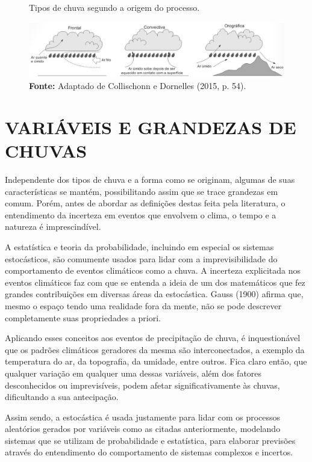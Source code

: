 \begin{figure}[!ht]
	\centering
	\caption{Tipos de chuva segundo a origem do processo.}
	\includegraphics[width=.9\linewidth]{figuras/tipos_de_chuva_segundo_a_origem_do_processo.png}
	\caption*{\textbf{Fonte:} Adaptado de Collischonn e Dornelles (2015, p. 54).}
	\label{fig:tipos_de_chuva_segundo_a_origem_do_processo.png}
\end{figure}

\section{VARIÁVEIS E GRANDEZAS DE CHUVAS}

Independente dos tipos de chuva e a forma como se originam, algumas de suas características se mantém, possibilitando assim que se trace grandezas em comum. Porém, antes de abordar as definições destas feita pela literatura, o entendimento da incerteza em eventos que envolvem o clima, o tempo e a natureza é imprescindível.

A estatística e teoria da probabilidade, incluindo em especial os sistemas estocásticos, são comumente usados para lidar com a imprevisibilidade do comportamento de eventos climáticos como a chuva. A incerteza explicitada nos eventos climáticos faz com que se entenda a ideia de um dos matemáticos que fez grandes contribuições em diversas áreas da estocástica. Gauss (1900) afirma que, mesmo o espaço tendo uma realidade fora da mente, não se pode descrever completamente suas propriedades a priori.

Aplicando esses conceitos aos eventos de precipitação de chuva, é inquestionável que os padrões climáticos geradores da mesma são interconectados, a exemplo da temperatura do ar, da topografia, da umidade, entre outros. Fica claro então, que qualquer variação em qualquer uma dessas variáveis, além dos fatores desconhecidos ou imprevisíveis, podem afetar significativamente às chuvas, dificultando a sua antecipação. 

Assim sendo, a estocástica é usada justamente para lidar com os processos aleatórios gerados por variáveis como as citadas anteriormente, modelando sistemas que se utilizam de probabilidade e estatística, para elaborar previsões através do entendimento do comportamento de sistemas complexos e incertos.


